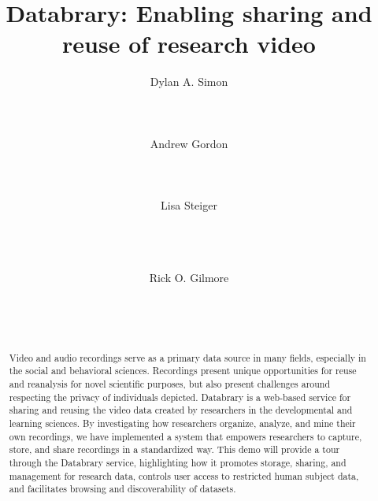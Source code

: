 \documentclass{sig-alternate-2013}
\begin{document}

\title{Databrary: Enabling sharing and reuse of research video}


\author{
\alignauthor
Dylan A. Simon\\
	\\
	\\
	\\
\alignauthor
Andrew Gordon\\
	\\
	\\
	\\
\alignauthor
Lisa Steiger\\
	\\
	\\
	\\
\and
Rick O. Gilmore\\
	\\
	\\
	\\
}

\maketitle

\begin{abstract}
Video and audio recordings serve as a primary data source in many fields, especially in the social and behavioral sciences.
Recordings present unique opportunities for reuse and reanalysis for novel scientific purposes, but also present challenges around respecting the privacy of individuals depicted.
Databrary is a web-based service for sharing and reusing the video data created by researchers in the developmental and learning sciences.
By investigating how researchers organize, analyze, and mine their own recordings, we have implemented a system that empowers researchers to capture, store, and share recordings in a standardized way.
This demo will provide a tour through the Databrary service, highlighting how it promotes storage, sharing, and management for research data, controls user access to restricted human subject data, and facilitates browsing and discoverability of datasets.
\end{abstract}
\end{document}
